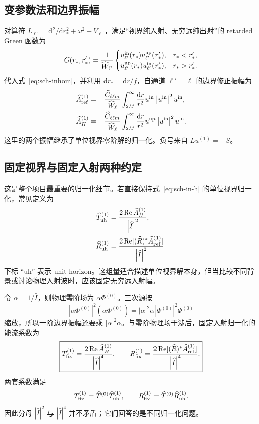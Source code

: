\documentclass[UTF8,fontset=fandol,11pt,a4paper,oneside]{ctexart}
\numberwithin{equation}{section}
\newcommand{\dd}{\mathrm d}
\newcommand{\abs}[1]{\left|#1\right|}
\newcommand{\Ree}{\operatorname{Re}}
\begin{document}
\subsection{变参数法和边界振幅}

对算符 $L_{\ell'}=\dd^2/\dd r_*^2+\omega^2-V_{\ell'}$，满足“视界纯入射、无穷远纯出射”的 retarded Green 函数为
\begin{equation}
G(r_*,r_*')=\frac{1}{\widehat W_{\ell'}}
\begin{cases}
u^{\rm in}_{\ell'}(r_*)u^{\rm up}_{\ell'}(r_*'),&r_*<r_*',\\
u^{\rm up}_{\ell'}(r_*)u^{\rm in}_{\ell'}(r_*'),&r_*>r_*'.
\end{cases}
\end{equation}
代入式~\eqref{eq:sch-inhom}，并利用 $\dd r_*=\dd r/f$，自通道 $\ell'=\ell$ 的边界修正振幅为
\begin{align}
\widehat A_{\rm ref}^{(1)}
&=-\frac{\widehat C_{\ell\ell m}}{\widehat W_\ell}
\int_{2M}^{\infty}\frac{\dd r}{r^2}
u^{\rm in}\abs{u^{\rm in}}^2u^{\rm in},
\label{eq:sch-Aref}\\
\widehat A_H^{(1)}
&=-\frac{\widehat C_{\ell\ell m}}{\widehat W_\ell}
\int_{2M}^{\infty}\frac{\dd r}{r^2}
u^{\rm up}\abs{u^{\rm in}}^2u^{\rm in}.
\label{eq:sch-AH}
\end{align}
这里的两个振幅继承了单位视界零阶解的归一化。负号来自 $L u^{(1)}=-S$。

\subsection{固定视界与固定入射两种约定}
\label{sec:sch-normalization}

这是整个项目最重要的归一化细节。若直接保持式~\eqref{eq:sch-in-h} 的单位视界归一化，常见定义为
\begin{align}
\widehat T_{\rm uh}^{(1)}
&=\frac{2\Ree\widehat A_H^{(1)}}{\abs{\widehat I}^2},\\
\widehat R_{\rm uh}^{(1)}
&=\frac{2\Ree[(\widehat R)^*\widehat A_{\rm ref}^{(1)}]}
{\abs{\widehat I}^2}.
\end{align}
下标 ``uh'' 表示 unit horizon。这组量适合描述单位视界解本身，但当比较不同背景或讨论物理入射波时，应该固定无穷远入射幅。

令 $\alpha=1/\widehat I$，则物理零阶场为 $\alpha\Phi^{(0)}$。三次源按
\begin{equation}
\abs{\alpha\Phi^{(0)}}^2(\alpha\Phi^{(0)})
=\abs{\alpha}^2\alpha\abs{\Phi^{(0)}}^2\Phi^{(0)}
\end{equation}
缩放，所以一阶边界振幅还要乘 $\abs{\alpha}^2\alpha$。与零阶物理场干涉后，固定入射归一化的能流系数为
\begin{align}
\boxed{
T_{\rm fix}^{(1)}
=\frac{2\Ree\widehat A_H^{(1)}}{\abs{\widehat I}^4},\qquad
R_{\rm fix}^{(1)}
=\frac{2\Ree[(\widehat R)^*\widehat A_{\rm ref}^{(1)}]}
{\abs{\widehat I}^4}.}
\label{eq:sch-fixed-flux}
\end{align}
两套系数满足
\begin{equation}
T_{\rm fix}^{(1)}=\widehat T^{(0)}\widehat T_{\rm uh}^{(1)},
\qquad
R_{\rm fix}^{(1)}=\widehat T^{(0)}\widehat R_{\rm uh}^{(1)}.
\end{equation}
因此分母 $\abs{\widehat I}^2$ 与 $\abs{\widehat I}^4$ 并不矛盾；它们回答的是不同归一化问题。
\end{document}
